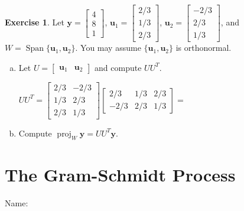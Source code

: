 \documentclass[10pt]{book}
\theoremstyle{definition}
\newtheorem{exercise}{Exercise}[section]
\newcommand{\name}[1][2.5in]{\vspace{-2.3em}\hfill Name: \underline{\hspace{#1}}}
\newcommand{\vect}[1]{\ensuremath{\boldsymbol{\mathbf{#1}}}}
\DeclareMathOperator{\Span}{Span}
\DeclareMathOperator{\proj}{proj}
\begin{document}
\begin{exercise} %
	Let $\vect{y}=\begin{bmatrix}4\\8\\1\end{bmatrix}$, $\vect{u}_1=\begin{bmatrix}2/3\\1/3\\2/3\end{bmatrix}$, $\vect{u}_2=\begin{bmatrix}-2/3\\2/3\\1/3\end{bmatrix}$, and $W=\Span\{\vect{u}_1,\vect{u}_2\}$. You may assume $\{\vect{u}_1,\vect{u}_2\}$ is orthonormal.
	\begin{enumerate}[(a)]
		\item Let $U=\begin{bmatrix}\vect{u}_1&\vect{u}_2\end{bmatrix}$ and compute $UU^T$.
		
		$UU^T = \begin{bmatrix}2/3&-2/3\\1/3&2/3\\2/3&1/3\end{bmatrix}
		\begin{bmatrix}2/3&1/3&2/3\\-2/3&2/3&1/3\end{bmatrix}=$
		\vspace{2em}
		\item Compute $\proj_W\vect{y}=UU^T\vect{y}$.
		\vspace{1in}
	\end{enumerate}
\end{exercise}


\newpage


\section{The Gram-Schmidt Process}
\name
\end{document}
